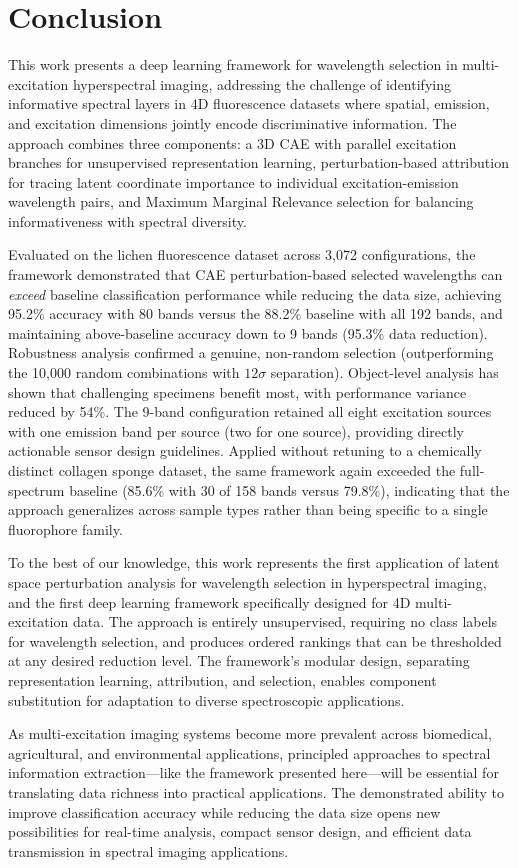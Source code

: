 \section{Conclusion}
\label{sec:conclusion}

This work presents a deep learning framework for wavelength selection in multi-excitation hyperspectral imaging, addressing the challenge of identifying informative spectral layers in 4D fluorescence datasets where spatial, emission, and excitation dimensions jointly encode discriminative information.
The approach combines three components: a 3D CAE with parallel excitation branches for unsupervised representation learning, perturbation-based attribution for tracing latent coordinate importance to individual excitation-emission wavelength pairs, and Maximum Marginal Relevance selection for balancing informativeness with spectral diversity.

Evaluated on the lichen fluorescence dataset across 3,072 configurations, the framework demonstrated that CAE perturbation-based selected wavelengths can \emph{exceed} baseline classification performance while reducing the data size, achieving 95.2\% accuracy with 80 bands versus the 88.2\% baseline with all 192 bands, and maintaining above-baseline accuracy down to 9 bands (95.3\% data reduction).
Robustness analysis confirmed a genuine, non-random selection (outperforming the 10,000 random combinations with $12\sigma$ separation). Object-level analysis has shown that challenging specimens benefit most, with performance variance reduced by 54\%.
The 9-band configuration retained all eight excitation sources with one emission band per source (two for one source), providing directly actionable sensor design guidelines.
Applied without retuning to a chemically distinct collagen sponge dataset, the same framework again exceeded the full-spectrum baseline (85.6\% with 30 of 158 bands versus 79.8\%), indicating that the approach generalizes across sample types rather than being specific to a single fluorophore family.

To the best of our knowledge, this work represents the first application of latent space perturbation analysis for wavelength selection in hyperspectral imaging, and the first deep learning framework specifically designed for 4D multi-excitation data.
The approach is entirely unsupervised, requiring no class labels for wavelength selection, and produces ordered rankings that can be thresholded at any desired reduction level.
The framework's modular design, separating representation learning, attribution, and selection, enables component substitution for adaptation to diverse spectroscopic applications.

As multi-excitation imaging systems become more prevalent across biomedical, agricultural, and environmental applications, principled approaches to spectral information extraction---like the framework presented here---will be essential for translating data richness into practical applications.
The demonstrated ability to improve classification accuracy while reducing the data size opens new possibilities for real-time analysis, compact sensor design, and efficient data transmission in spectral imaging applications.